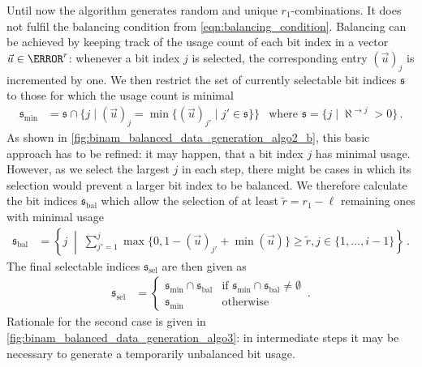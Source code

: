 Until now the algorithm generates \nSamples random and unique $r_1$-combinations. It does not fulfil the balancing condition from \cref{eqn:balancing_condition}. Balancing can be achieved by keeping track of the usage count of each bit index in a vector $\vec u \in \N^r$: whenever a bit index $j$ is selected, the corresponding entry $(\vec u)_j$ is incremented by one. We then restrict the set of currently selectable bit indices $\mathfrak{s}$ to those for which the usage count is minimal
\begin{align}
	\mathfrak{s}_{\mathrm{min}} &= \mathfrak{s} \cap \{j \mid (\vec u)_j = \min\{(\vec u)_{j'} \mid j' \in \mathfrak{s}\}\} & \text{where } \mathfrak{s} = \{j \mid \aleph^{\to j} > 0\} \,.
\end{align}
As shown in \cref{fig:binam_balanced_data_generation_algo2_b}, this basic approach has to be refined: it may happen, that a bit index $j$ has minimal usage. However, as we select the largest $j$ in each step, there might be cases in which its selection would prevent a larger bit index to be balanced. We therefore calculate the bit indices $\mathfrak{s}_{\mathrm{bal}}$ which allow the selection of at least $\tilde r = r_1 - \ell$ remaining ones with minimal usage
\begin{align}
	\mathfrak{s}_{\mathrm{bal}} &= \left\{ j \;\middle\vert\; \sum\nolimits_{j' = 1}^{j} \max\{0, 1 - (\vec u)_{j'} + \min(\vec u)\} \geq \tilde r, j \in \{1, \ldots, i - 1\} \right\} \,.
\end{align}
The final selectable indices $\mathfrak{s}_{\mathrm{sel}}$ are then given as
\begin{align}
	\mathfrak{s}_{\mathrm{sel}} &= \begin{cases}
									\mathfrak{s}_{\mathrm{min}} \cap \mathfrak{s}_{\mathrm{bal}} & \text{if } \mathfrak{s}_{\mathrm{min}} \cap \mathfrak{s}_{\mathrm{bal}} \neq \emptyset \\
									\mathfrak{s}_{\mathrm{min}} & \text{otherwise}
	                               \end{cases} \,.
\end{align}
Rationale for the second case is given in \cref{fig:binam_balanced_data_generation_algo3}: in intermediate steps it may be necessary to generate a temporarily unbalanced bit usage.

